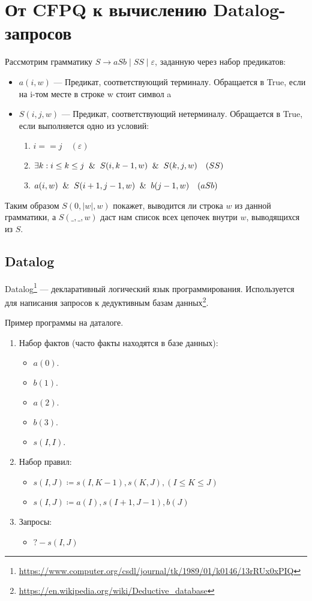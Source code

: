 \section{От CFPQ к вычислению Datalog-запросов}\label{Subsection Datalog}
Рассмотрим грамматику  $S \rightarrow aSb \mid SS \mid \varepsilon$, заданную через набор предикатов:
\begin{itemize}
	\item $a(i, w)$ --- Предикат, соответствующий терминалу. Обращается в True, если на i-том месте в строке w стоит символ a
	\item $S(i, j, w)$ --- Предикат, соответствующий нетерминалу. Обращается в True, если выполняется одно из условий:
	\begin{enumerate}
		\item $i == j \quad(\varepsilon)$
		\item $\exists k: i \leq k \leq j \And S(i, k - 1, w) \And S(k, j, w)  \quad (SS)$
		\item  ${a(i, w) \And S(i+1, j-1, w) \And b(j-1, w)} \quad (aSb)$
	\end{enumerate}
\end{itemize}

Таким образом $S(0,|w|,w)$ покажет, выводится ли строка $w$ из данной грамматики,
а $S(\_,\_,w)$ даст нам список всех цепочек внутри $w$, выводящихся из $S$.

\subsection{Datalog}
Datalog\cite{Datalog}\footnote{\url{https://www.computer.org/csdl/journal/tk/1989/01/k0146/13rRUx0xPIQ}} --- декларативный логический язык программирования. Используется для написания запросов к дедуктивным базам данных\footnote{\url{https://en.wikipedia.org/wiki/Deductive_database}}. \\

\begin{example}
	Пример программы на даталоге.
	\begin{enumerate}
		\item Набор фактов (часто факты находятся в базе данных):
		\begin{itemize}
			\item $a(0).$
			\item $b(1).$
			\item $a(2).$
			\item $b(3).$
			\item $s(I, I).$
		\end{itemize}
		\item Набор правил:
		\begin{itemize}
			\item $s(I, J) \coloneq s(I, K-1), s(K,J), (I \leq K \leq J)$
			\item $s(I,J)\coloneq a(I), s(I+1, J-1),b(J)$
		\end{itemize}
		\item Запросы:
		\begin{itemize}
			\item $?- s(I, J)$
		\end{itemize}
	\end{enumerate}
\end{example}

